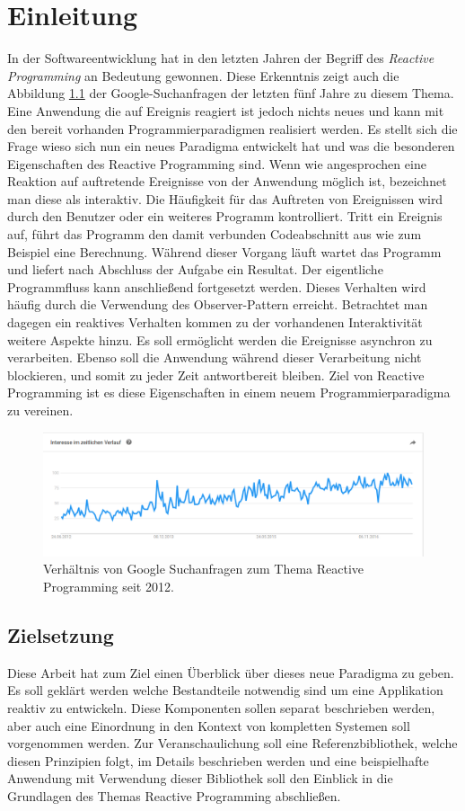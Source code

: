 \chapter{Einleitung}
\label{cha:einleitung}
In der Softwareentwicklung hat in den letzten Jahren der Begriff des \textit{Reactive Programming} an Bedeutung gewonnen. Diese Erkenntnis zeigt auch die Abbildung \ref{pic:googletrend} der Google-Suchanfragen der letzten fünf Jahre zu diesem Thema. Eine Anwendung die auf Ereignis reagiert ist jedoch nichts neues und kann mit den bereit vorhanden Programmierparadigmen realisiert werden. Es stellt sich die Frage wieso sich nun ein neues Paradigma entwickelt hat und was die besonderen Eigenschaften des Reactive Programming sind. Wenn wie angesprochen eine Reaktion auf auftretende Ereignisse von der Anwendung möglich ist, bezeichnet man diese als interaktiv. Die Häufigkeit für das Auftreten von Ereignissen wird durch den Benutzer oder ein weiteres Programm kontrolliert. Tritt ein Ereignis auf, führt das Programm den damit verbunden Codeabschnitt aus wie zum Beispiel eine Berechnung. Während dieser Vorgang läuft wartet das Programm und liefert nach Abschluss der Aufgabe ein Resultat. Der eigentliche Programmfluss kann anschließend fortgesetzt werden. Dieses Verhalten wird häufig durch die Verwendung des Observer-Pattern erreicht. Betrachtet man dagegen ein reaktives Verhalten kommen zu der vorhandenen Interaktivität weitere Aspekte hinzu. Es soll ermöglicht werden die Ereignisse asynchron zu verarbeiten. Ebenso soll die Anwendung während dieser Verarbeitung nicht blockieren, und somit zu jeder Zeit antwortbereit bleiben. Ziel von Reactive Programming ist es diese Eigenschaften in einem neuem Programmierparadigma zu vereinen.
\begin{figure}[hbt]
	\centering
	\includegraphics[width=1\textwidth]{Abb/rptrend}
	\caption{Verhältnis von Google Suchanfragen zum Thema Reactive Programming seit 2012.}
	\label{pic:googletrend}
\end{figure}
\section{Zielsetzung}
Diese Arbeit hat zum Ziel einen Überblick über dieses neue Paradigma zu geben. Es soll geklärt werden welche Bestandteile notwendig sind um eine Applikation reaktiv zu entwickeln. Diese Komponenten sollen separat beschrieben werden, aber auch eine Einordnung in den Kontext von kompletten Systemen soll vorgenommen werden. Zur Veranschaulichung soll eine Referenzbibliothek, welche diesen Prinzipien folgt, im Details beschrieben werden und eine beispielhafte Anwendung mit Verwendung dieser Bibliothek soll den Einblick in die Grundlagen des Themas Reactive Programming abschließen.
